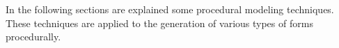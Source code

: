 In the following sections are explained some procedural modeling techniques. These techniques are applied to the generation of various types of forms procedurally.
















